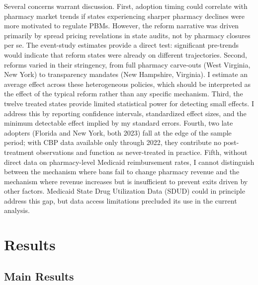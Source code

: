 \documentclass[12pt]{article}
\begin{document}
Several concerns warrant discussion. First, adoption timing could correlate with pharmacy market trends if states experiencing sharper pharmacy declines were more motivated to regulate PBMs. However, the reform narrative was driven primarily by spread pricing revelations in state audits, not by pharmacy closures per se. The event-study estimates provide a direct test: significant pre-trends would indicate that reform states were already on different trajectories. Second, reforms varied in their stringency, from full pharmacy carve-outs (West Virginia, New York) to transparency mandates (New Hampshire, Virginia). I estimate an average effect across these heterogeneous policies, which should be interpreted as the effect of the typical reform rather than any specific mechanism. Third, the twelve treated states provide limited statistical power for detecting small effects. I address this by reporting confidence intervals, standardized effect sizes, and the minimum detectable effect implied by my standard errors. Fourth, two late adopters (Florida and New York, both 2023) fall at the edge of the sample period; with CBP data available only through 2022, they contribute no post-treatment observations and function as never-treated in practice. Fifth, without direct data on pharmacy-level Medicaid reimbursement rates, I cannot distinguish between the mechanism where bans fail to change pharmacy revenue and the mechanism where revenue increases but is insufficient to prevent exits driven by other factors. Medicaid State Drug Utilization Data (SDUD) could in principle address this gap, but data access limitations precluded its use in the current analysis.

\section{Results}

\subsection{Main Results}
\end{document}
